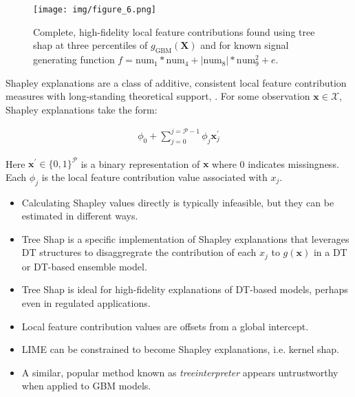 \documentclass{article}
\begin{document}
\begin{figure}[htb]
	\begin{center}
		\texttt{[image: img/figure\_6.png]}
		\caption{Complete, high-fidelity local feature contributions found using tree shap at three percentiles of $g_{\text{GBM}}(\mathbf{X})$ and for known signal generating function $f = \text{num} _1 * \text{num}_4 + |\text{num}_8| * \text{num}_9^2 + e$.}
		\label{fig:pdp_ice}
	\end{center}
\end{figure}

Shapley explanations are a class of additive, consistent local feature contribution measures with long-standing theoretical support, \cite{shapley}. For some observation $\mathbf{x} \in \mathcal{X}$, Shapley explanations take the form:

\vspace{-5pt}

\begin{equation}
\begin{aligned}
\phi_0 + \sum_{j=0}^{j=\mathcal{P} - 1} \phi_j \mathbf{x}_j^\prime
\end{aligned}
\end{equation}

Here $\mathbf{x}^\prime \in \{0,1\}^\mathcal{P}$ is a binary representation of $\mathbf{x}$ where 0 indicates missingness. Each $\phi_j$ is the local feature contribution value associated with $x_j$.

\begin{itemize}
	
	\item Calculating Shapley values directly is typically infeasible, but they can be estimated in different ways.
	
	\item Tree Shap is a specific implementation of Shapley explanations that leverages DT structures to disaggregrate the contribution of each $x_j$ to $g(\mathbf{x})$ in a DT or DT-based ensemble model. \cite{tree_shap}
	
\end{itemize}

\begin{itemize}
	
	\item Tree Shap is ideal for high-fidelity explanations of DT-based models, perhaps even in regulated applications.
	
	\item Local feature contribution values are offsets from a global intercept.
	
	\item LIME can be constrained to become Shapley explanations, i.e. kernel shap.
	
	\item A similar, popular method known as \textit{treeinterpreter} appears untrustworthy when applied to GBM models. 
	
\end{itemize}
\end{document}
